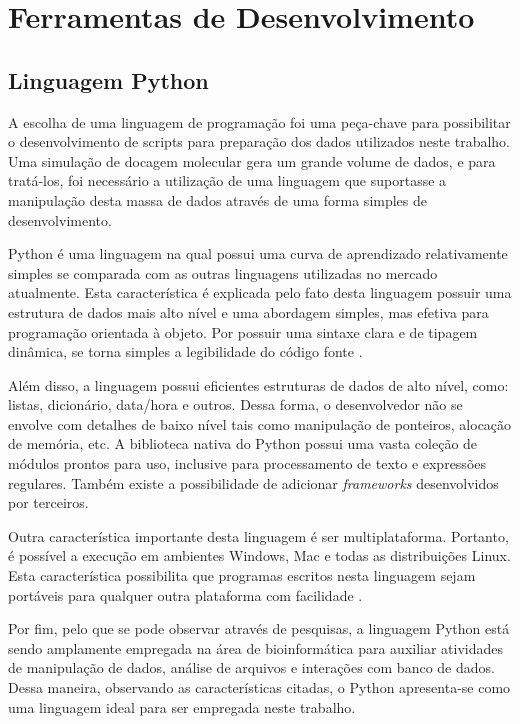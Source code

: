 \chapter{Ferramentas de Desenvolvimento}

\section{Linguagem Python}
A escolha de uma linguagem de programação foi uma peça-chave para possibilitar o desenvolvimento de scripts para preparação dos dados utilizados neste trabalho. Uma simulação de docagem molecular gera um grande volume de dados, e para tratá-los, foi necessário a utilização de uma linguagem que suportasse a manipulação desta massa de dados através de uma forma simples de desenvolvimento.

Python é uma linguagem na qual possui uma curva de aprendizado relativamente simples se comparada com as outras linguagens utilizadas no mercado atualmente. Esta característica é explicada pelo fato desta linguagem possuir uma estrutura de dados mais alto nível e uma abordagem simples, mas efetiva para programação orientada à objeto. Por possuir uma sintaxe clara e de tipagem dinâmica, se torna simples a legibilidade do código fonte \cite{pyt00}. 

Além disso, a linguagem possui eficientes estruturas de dados de alto nível, como: listas, dicionário, data/hora e outros. Dessa forma, o desenvolvedor não se envolve com detalhes de baixo nível tais como manipulação de ponteiros, alocação de memória, etc. A biblioteca nativa do Python possui uma vasta coleção de módulos prontos para uso, inclusive para processamento de texto e expressões regulares. Também existe a possibilidade de adicionar \emph{frameworks} desenvolvidos por terceiros.

Outra característica importante desta linguagem é ser multiplataforma. Portanto, é possível a execução em ambientes Windows, Mac e todas as distribuições Linux. Esta característica possibilita que programas escritos nesta linguagem sejam portáveis para qualquer outra plataforma com facilidade \cite{pyt01}.

Por fim, pelo que se pode observar através de pesquisas, a linguagem Python está sendo amplamente empregada na área de bioinformática para auxiliar atividades de manipulação de dados, análise de arquivos e interações com banco de dados. Dessa maneira, observando as características citadas, o Python apresenta-se como uma linguagem ideal para ser empregada neste trabalho.

